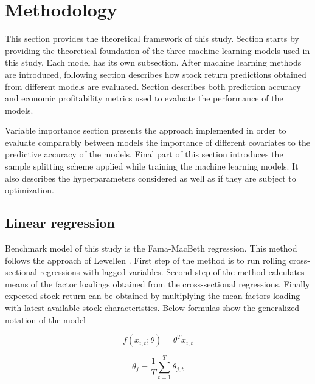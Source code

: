 \documentclass{article}
\begin{document}

\section{Methodology} \label{Methodology}

This section provides the theoretical framework of this study. Section starts by providing the theoretical foundation of the three machine learning models used in this study. Each model has its own subsection. After machine learning methods are introduced, following section describes how stock return predictions obtained from different models are evaluated. Section describes both prediction accuracy and economic profitability metrics used to evaluate the performance of the models. \par

Variable importance section presents the approach implemented in order to evaluate comparably between models the importance of different covariates to the predictive accuracy of the models. Final part of this section introduces the sample splitting scheme applied while training the machine learning models. It also describes the hyperparameters considered as well as if they are subject to optimization. \par

\subsection{Linear regression}\label{LinearRegression}
Benchmark model of this study is the Fama-MacBeth \citeyear{FamaMacBeth1973} regression. This method follows the approach of Lewellen \citeyear{Lewellen2015}. First step of the method is to run rolling cross-sectional regressions with lagged variables. Second step of the method calculates means of the factor loadings obtained from the cross-sectional regressions. Finally expected stock return can be obtained by multiplying the mean factors loading with latest available stock characteristics. Below formulas show the generalized notation of the model \par

\begin{equation}
f(x_{i, t}; \theta) = \theta^T x_{i, t}
\end{equation}

\begin{equation}
\overline \theta_j = \frac{1}{T} \sum^{T}_{t=1}\theta_{j, t}
\end{equation}
\end{document}
